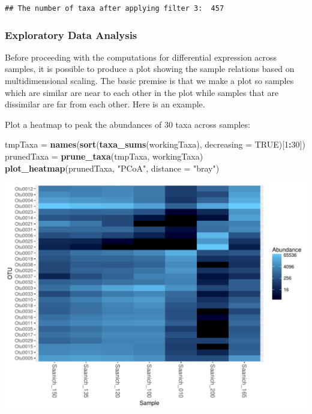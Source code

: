 \documentclass[11 pt,]{article}
\newenvironment{Shaded}{\begin{snugshade}}{\end{snugshade}}
\newcommand{\KeywordTok}[1]{\textcolor[rgb]{0.13,0.29,0.53}{\textbf{#1}}}
\newcommand{\DataTypeTok}[1]{\textcolor[rgb]{0.13,0.29,0.53}{#1}}
\newcommand{\DecValTok}[1]{\textcolor[rgb]{0.00,0.00,0.81}{#1}}
\newcommand{\StringTok}[1]{\textcolor[rgb]{0.31,0.60,0.02}{#1}}
\newcommand{\OtherTok}[1]{\textcolor[rgb]{0.56,0.35,0.01}{#1}}
\newcommand{\OperatorTok}[1]{\textcolor[rgb]{0.81,0.36,0.00}{\textbf{#1}}}
\newcommand{\NormalTok}[1]{#1}
\begin{document}
\begin{verbatim}
## The number of taxa after applying filter 3:  457
\end{verbatim}

\subsubsection{Exploratory Data
Analysis}\label{exploratory-data-analysis}

Before proceeding with the computations for differential expression
across samples, it is possible to produce a plot showing the sample
relations based on multidimensional scaling. The basic premise is that
we make a plot so samples which are similar are near to each other in
the plot while samples that are dissimilar are far from each other. Here
is an example.

Plot a heatmap to peak the abundances of \(30\) taxa across samples:

\begin{Shaded}
\begin{Highlighting}[]
\NormalTok{tmpTaxa =}\StringTok{ }\KeywordTok{names}\NormalTok{(}\KeywordTok{sort}\NormalTok{(}\KeywordTok{taxa_sums}\NormalTok{(workingTaxa), }\DataTypeTok{decreasing =} \OtherTok{TRUE}\NormalTok{)[}\DecValTok{1}\OperatorTok{:}\DecValTok{30}\NormalTok{])}
\NormalTok{prunedTaxa =}\StringTok{ }\KeywordTok{prune_taxa}\NormalTok{(tmpTaxa, workingTaxa)}
\KeywordTok{plot_heatmap}\NormalTok{(prunedTaxa, }\StringTok{"PCoA"}\NormalTok{, }\DataTypeTok{distance =} \StringTok{"bray"}\NormalTok{)}
\end{Highlighting}
\end{Shaded}

\includegraphics{Figs/unnamed-chunk-9-1.pdf}
\end{document}
